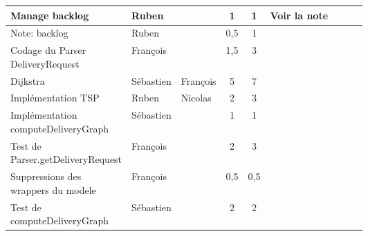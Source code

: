 \begin{longtable}{|p{0.3\linewidth}|l|l|c|c|p{0.3\linewidth}|}
Manage backlog                              & Ruben                                          &                                           & 1                             & 1                            & Voir la note                                                \\ \hline
Note: backlog                               & Ruben                                          &                                           & 0,5                           & 1                            &                                                             \\ \hline
Codage du Parser DeliveryRequest            & François                                       &                                           & 1,5                           & 3                            &                                                             \\ \hline
Dijkstra                                    & Sébastien                                      & François                                  & 5                             & 7                            &                                                             \\ \hline
Implémentation TSP                          & Ruben                                          & Nicolas                                   & 2                             & 3                            &                                                             \\ \hline
Implémentation computeDeliveryGraph         & Sébastien                                      &                                           & 1                             & 1                            &                                                             \\ \hline
Test de Parser.getDeliveryRequest           & François                                       &                                           & 2                             & 3                            &                                                             \\ \hline
Suppressions des wrappers du modele         & François                                       &                                           & 0,5                           & 0,5                          &                                                             \\ \hline
Test de computeDeliveryGraph                & Sébastien                                      &                                           & 2                             & 2                            &                                                             \\ \hline

\end{longtable}
